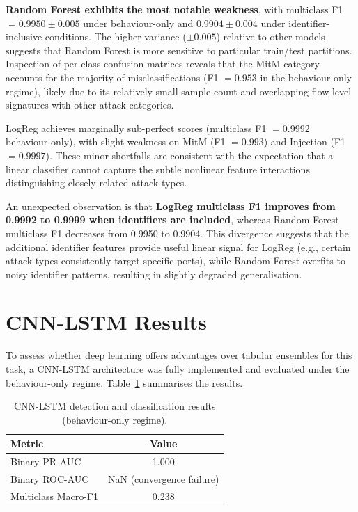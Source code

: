 \documentclass[12pt,a4paper]{report}
\begin{document}
\textbf{Random Forest exhibits the most notable weakness}, with multiclass F1 $= 0.9950 \pm 0.005$ under behaviour-only and $0.9904 \pm 0.004$ under identifier-inclusive conditions. The higher variance ($\pm 0.005$) relative to other models suggests that Random Forest is more sensitive to particular train/test partitions. Inspection of per-class confusion matrices reveals that the MitM category accounts for the majority of misclassifications (F1 $= 0.953$ in the behaviour-only regime), likely due to its relatively small sample count and overlapping flow-level signatures with other attack categories.

LogReg achieves marginally sub-perfect scores (multiclass F1 $= 0.9992$ behaviour-only), with slight weakness on MitM (F1 $= 0.993$) and Injection (F1 $= 0.9997$). These minor shortfalls are consistent with the expectation that a linear classifier cannot capture the subtle nonlinear feature interactions distinguishing closely related attack types.

An unexpected observation is that \textbf{LogReg multiclass F1 improves from 0.9992 to 0.9999 when identifiers are included}, whereas Random Forest multiclass F1 decreases from 0.9950 to 0.9904. This divergence suggests that the additional identifier features provide useful linear signal for LogReg (e.g., certain attack types consistently target specific ports), while Random Forest overfits to noisy identifier patterns, resulting in slightly degraded generalisation.

\section{CNN-LSTM Results}
\label{sec:cnnlstm-results}

To assess whether deep learning offers advantages over tabular ensembles for this task, a CNN-LSTM architecture was fully implemented and evaluated under the behaviour-only regime. Table~\ref{tab:cnnlstm} summarises the results.

\begin{table}[H]
\centering
\caption{CNN-LSTM detection and classification results (behaviour-only regime).}
\label{tab:cnnlstm}
\begin{tabular}{lc}
\toprule
\textbf{Metric} & \textbf{Value} \\
\midrule
Binary PR-AUC & 1.000 \\
Binary ROC-AUC & NaN (convergence failure) \\
Multiclass Macro-F1 & 0.238 \\
\bottomrule
\end{tabular}
\end{table}
\end{document}
